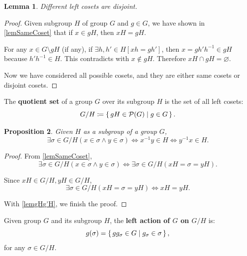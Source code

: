 \documentclass[12pt, letterpaper]{article}
\newcommand{\power}{\mathcal{P}}
\newcommand{\define}{\coloneqq}
\renewcommand{\emptyset}{\varnothing}
\newtheorem{prop}{Proposition}[section]
\newtheorem{lem}[prop]{Lemma}
\theoremstyle{definition}
\theoremstyle{remark}
\theoremstyle{definition}
\theoremstyle{plain}
\numberwithin{equation}{section}
\begin{document}
	\begin{lem}\label{lemDisjointLeftCoset}
		Different left cosets are disjoint.
	\end{lem}
	\begin{proof}
		Given subgroup $H$ of group $G$ and $g\in G$,
		we have shown in \autoref{lemSameCoset} that if $x\in gH$, then $xH=gH$.
		
		For any $x\in G\setminus gH$ (if any),
		if $\exists h,h'\in H[xh=gh']$, then $x=gh'h^{-1}\in gH$ because $h'h^{-1}\in H$.
		This contradicts with $x\notin gH$. Therefore $xH\cap gH=\emptyset$.
		
		Now we have considered all possible cosets, and they are either same cosets or disjoint cosets.
	\end{proof}

	\begin{def*}
		The \textbf{quotient set} of a group $G$ over its subgroup $H$ is the set of all left cosets:
		\[G/H\define\set{gH\in\power(G)|g\in G}. \]
	\end{def*}

	\begin{prop}\label{lemXsigmaYsigma}
		Given $H$ as a subgroup of a group $G$,
		\[\exists \sigma\in G/H(x\in\sigma \land y\in \sigma)\iff x^{-1}y\in H\iff y^{-1}x\in H.\]
	\end{prop}
	\begin{proof}
		From \autoref{lemSameCoset},
		\[\exists \sigma\in G/H(x\in\sigma \land y\in \sigma)\iff \exists \sigma \in G/H(xH=\sigma=yH).\]
		
		Since $xH\in G/H,yH\in G/H$,
		\[\exists \sigma \in G/H(xH=\sigma=yH)\iff xH=yH.\]
		
		With \autoref{lemgHg'H}, we finish the proof.
	\end{proof}

	\begin{def*}
		Given group $G$ and its subgroup $H$,
		the \textbf{left action of $G$ on $G/H$} is:
		\[g(\sigma) =\set{gg_{\sigma}\in G|g_\sigma\in \sigma}, \]
		for any $\sigma\in G/H$.
	\end{def*}
\end{document}

